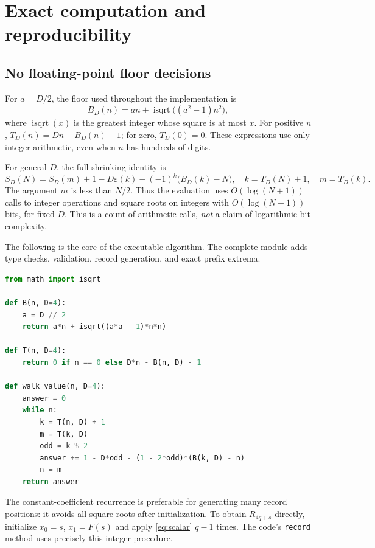 \documentclass[11pt]{article}
\theoremstyle{definition}
\numberwithin{equation}{section}
\newcommand{\odd}{\varepsilon}
\newcommand{\isqrt}{\operatorname{isqrt}}
\begin{document}
\section{Exact computation and reproducibility}\label{sec:code}
\subsection{No floating-point floor decisions}
For $a=D/2$, the floor used throughout the implementation is
\begin{equation}\label{eq:integerfloor}
 B_D(n)=an+\isqrt\bigl((a^2-1)n^2\bigr),
\end{equation}
where $\isqrt(x)$ is the greatest integer whose square is at most $x$.
For positive $n$, $T_D(n)=Dn-B_D(n)-1$; for zero, $T_D(0)=0$.
These expressions use only integer arithmetic, even when $n$ has hundreds of digits.

For general $D$, the full shrinking identity is
\begin{equation}\label{eq:generalalgorithm}
 S_D(N)=S_D(m)+1-D\odd(k)-(-1)^k\bigl(B_D(k)-N\bigr),
 \quad k=T_D(N)+1,\quad m=T_D(k).
\end{equation}
The argument $m$ is less than $N/2$. Thus the evaluation uses $O(\log(N+1))$ calls to integer operations and square roots on integers with $O(\log(N+1))$ bits, for fixed $D$. This is a count of arithmetic calls, \emph{not} a claim of logarithmic bit complexity.

The following is the core of the executable algorithm. The complete module adds type checks, validation, record generation, and exact prefix extrema.
\begin{lstlisting}[language=Python]
from math import isqrt

def B(n, D=4):
    a = D // 2
    return a*n + isqrt((a*a - 1)*n*n)

def T(n, D=4):
    return 0 if n == 0 else D*n - B(n, D) - 1

def walk_value(n, D=4):
    answer = 0
    while n:
        k = T(n, D) + 1
        m = T(k, D)
        odd = k % 2
        answer += 1 - D*odd - (1 - 2*odd)*(B(k, D) - n)
        n = m
    return answer
\end{lstlisting}
The constant-coefficient recurrence is preferable for generating many record positions: it avoids all square roots after initialization. To obtain $R_{4q+s}$ directly, initialize $x_0=s$, $x_1=F(s)$ and apply \eqref{eq:scalar} $q-1$ times. The code's \texttt{record} method uses precisely this integer procedure.
\end{document}
